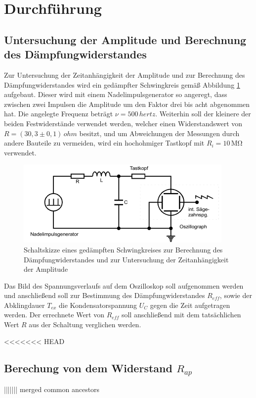 \section{Durchführung}
\label{sec:Durchführung}

\subsection{Untersuchung der Amplitude und Berechnung des Dämpfungwiderstandes}

Zur Untersuchung der Zeitanhängigkeit der Amplitude und zur Berechnung des Dämpfungwiderstandes
wird ein gedämpfter Schwingkreis gemäß Abbildung \ref{fig:gsk2} aufgebaut. Dieser wird mit einem
Nadelimpulsgenerator so angeregt, dass zwischen zwei Impulsen die Amplitude um den Faktor drei 
bis acht abgenommen hat. Die angelegte Frequenz beträgt $\nu = 500\, \si{hertz}$. Weiterhin
soll der kleinere der beiden Festwiderstände verwendet werden, welcher einen Widerstandswert
von $R = (30,3 \pm 0,1)\, \si{ohm}$ besitzt,
und um Abweichungen der Messungen durch andere Bauteile zu vermeiden, wird ein hochohmiger 
Tastkopf mit $R_i = 10\, \si{\mega\ohm}$ verwendet.

\begin{figure}[H]
  \centering
  \includegraphics{content/aufgabeA.png}
  \caption{Schaltskizze eines gedämpften Schwingkreises zur Berechnung des Dämpfungwiderstandes und zur Untersuchung der Zeitanhängigkeit der Amplitude \cite{sample354}}
  \label{fig:gsk2}
\end{figure}
\noindent
Das Bild des Spannungsverlaufs auf dem Oszilloskop soll aufgenommen werden und anschließend soll
zur Bestimmung des Dämpfungwiderstandes $R_{eff}$, sowie der Abklingdauer $T_{ex}$ die Kondensatorspannung
$U_C$ gegen die Zeit aufgetragen werden. Der errechnete Wert von $R_{eff}$ soll anschließend mit dem
tatsächlichen Wert $R$ aus der Schaltung verglichen werden.



<<<<<<< HEAD
\subsection{Berechung von dem Widerstand $R_{ap}$}
||||||| merged common ancestors
